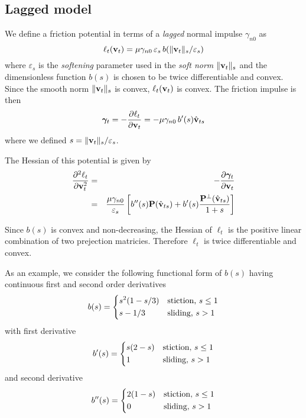 \subsection{Lagged model}

We define a friction potential in terms of a \emph{lagged} normal impulse $\gamma_{n0}$ as
\begin{equation}
    \ell_t({\mathbf{v}}_t) = \mu\gamma_{n0}\,\varepsilon_s\,b(\Vert{\mathbf{v}}_t\Vert_s/\varepsilon_s)
\end{equation}
where $\varepsilon_s$ is the \emph{softening} parameter used in the \emph{soft norm} $\Vert{\mathbf{v}}_t\Vert_s$ and the dimensionless function $b(s)$ is chosen to be twice differentiable and convex. Since the smooth norm $\Vert{\mathbf{v}}_t\Vert_s$ is convex, $\ell_t({\mathbf{v}}_t)$ is convex. The friction impulse is then
\begin{equation}
    {\bm\gamma}_t = -\frac{\partial\ell_t}{\partial{\mathbf{v}}_t}=-\mu\gamma_{n0}\,b'(s)\hat{{\mathbf{v}}}_{ts}
\end{equation}
where we defined $s=\Vert{\mathbf{v}}_t\Vert_s/\varepsilon_s$.

The Hessian of this potential is given by
\begin{eqnarray}
    \frac{\partial^2\ell_t}{\partial{\mathbf{v}}_t^2}&=&-\frac{\partial{\bm\gamma}_t}{\partial{\mathbf{v}}_t}\nonumber\\
    &=&\frac{\mu\gamma_{n0}}{\varepsilon_s}\left[b''(s){\mathbf{P}}(\hat{{\mathbf{v}}}_{ts})+b'(s)\frac{{\mathbf{P}}^\perp(\hat{{\mathbf{v}}}_{ts})}{1+s}\right]
\end{eqnarray}

Since $b(s)$ is convex and non-decreasing, the Hessian of $\ell_t$ is the
positive linear combination of two prejection matricies. Therefore $\ell_t$ is twice differentiable and convex.

As an example, we consider the following functional form of $b(s)$ having continuous first and second order derivatives
\begin{eqnarray}
    b(s)=\begin{dcases}
        s^2(1-s/3) & \text{stiction, } s \le 1\\        
        s - 1/3 & \text{sliding, } s > 1
    \end{dcases}
\end{eqnarray}
with first derivative
\begin{eqnarray}
    b'(s)=\begin{dcases}
        s(2-s) & \text{stiction, } s \le 1\\        
        1 & \text{sliding, } s > 1
    \end{dcases}
\end{eqnarray}
and second derivative
\begin{eqnarray}
    b''(s)=\begin{dcases}
        2(1-s) & \text{stiction, } s \le 1\\        
        0 & \text{sliding, } s > 1
    \end{dcases}
\end{eqnarray}

